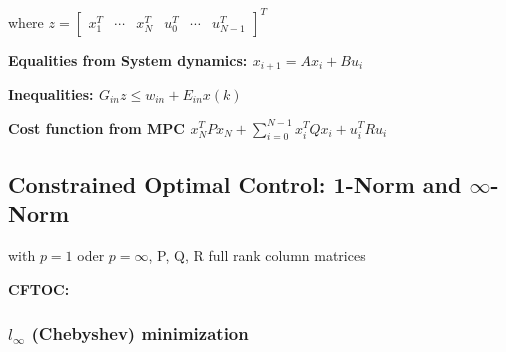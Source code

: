 \documentclass[8pt,a4paper]{scrartcl}
\begin{document}
\begin{multicols*}{3}
where $z=\begin{bmatrix}x_1^T&\cdots&x_N^T&u_0^T&\cdots&u_{N-1}^T\end{bmatrix}^T$

\finn

\textbf{Equalities from System dynamics: $x_{i+1}=Ax_i+Bu_i$}


\textbf{Inequalities: $G_{in}z\leq w_{in}+E_{in}x(k)$}



\textbf{Cost function from MPC $x_N^TPx_N+\sum\limits_{i=0}^{N-1}x_i^TQx_i+u_i^TRu_i$}


\subsection{Constrained Optimal Control: 1-Norm and $\infty$-Norm}


with $p=1$ oder $p=\infty$, P, Q, R full rank column matrices

\textbf{CFTOC:}


%
%
%
%

\subsubsection{$l_\infty$ (Chebyshev) minimization}


\end{multicols*}
\end{document}
